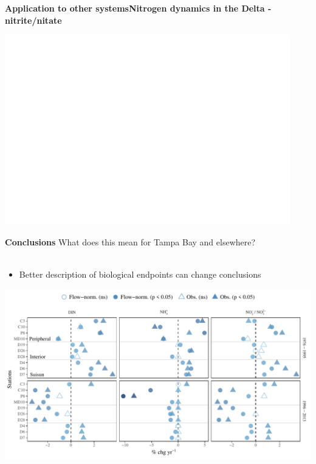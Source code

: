 \documentclass[serif]{beamer}\usepackage[]{graphicx}\usepackage[]{color}
\begin{document}
\begin{frame}{\textbf{Application to other systems}}{\textbf{Nitrogen dynamics in the Delta - nitrite/nitate}} 
\centerline{\includegraphics[width = 0.93\textwidth, page = 2]{fig/trndsperno23.pdf}}
\end{frame}



\begin{frame}[t]{\textbf{Conclusions}}
\onslide<+->
What does this mean for Tampa Bay and elsewhere?\\~\\
\vspace{-0.2in}
\begin{itemize}
\item Better description of biological endpoints can change conclusions
\end{itemize}
\onslide<+->
\centerline{\includegraphics[width = \textwidth]{fig/trndcomp1.pdf}}
\end{frame}
\end{document}
